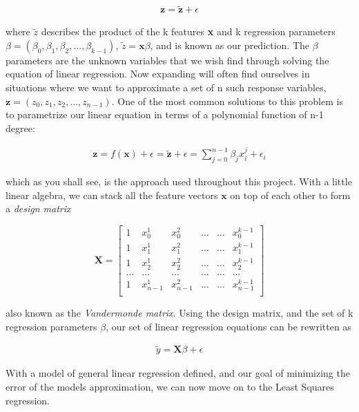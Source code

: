 \documentclass[a4paper, 10pt]{article}
\begin{document}
\begin{gather*}
	\textbf{z} = \tilde{\textbf{z}} + \epsilon
\end{gather*}

where \textbf{$\tilde{z}$} describes the product of the k features \textbf{x} and k regression parameters $\beta = (\beta_0, \beta_1, \beta_2, ... , \beta_{k-1})$, $\textbf{$\tilde{z}$} = \textbf{x}\beta$, and is known as our prediction. The $\beta$ parameters are the unknown variables that we wish find through solving the equation of linear regression.  Now expanding will often find ourselves in situations where we want to approximate a set of n such response variables, $\textbf{z} = (z_0, z_1, z_2, ... , z_{n-1})$. One of the most common solutions to this problem is to parametrize our linear equation in terms of a polynomial function of n-1 degree: 


\begin{gather*}
	\textbf{z} = f(\textbf{x}) + \epsilon = \tilde{\textbf{z}} + \epsilon = \sum_{j=0}^{n-1} \beta_j x_{i}^j + \epsilon_i 
\end{gather*}

which as you shall see, is the approach used throughout this project. With a little linear algebra, we can stack all the feature vectors $\textbf{x}$ on top of each other to form a \emph{design matrix}


$$
\boldsymbol{X}=
\begin{bmatrix} 
1& x_{0}^1 &x_{0}^2& \dots & \dots &x_{0}^{k-1}\\
1& x_{1}^1 &x_{1}^2& \dots & \dots &x_{1}^{k-1}\\
1& x_{2}^1 &x_{2}^2& \dots & \dots &x_{2}^{k-1}\\                      
\dots& \dots &\dots& \dots & \dots &\dots\\
1& x_{n-1}^1 &x_{n-1}^2& \dots & \dots &x_{n-1}^{k-1}\\
\end{bmatrix}
$$

also known as the \emph{Vandermonde matrix}. Using the design matrix, and the set of k regression parameters \textbf{$\beta$}, our set of linear regression equations can be rewritten as
 
\begin{gather*}
	\tilde{y} = \textbf{X}\beta + \epsilon
\end{gather*}

With a model of general linear regression defined, and our goal of minimizing the error of the models approximation, we can now move on to the Least Squares regression. 
\end{document}
